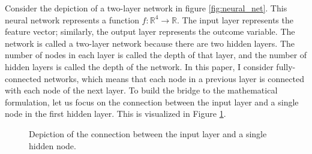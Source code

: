 Consider the depiction of a two-layer network in figure \ref{fig:neural_net}. This
neural network represents a function $f : \mathbb{R}^4 \to \mathbb{R}$. The input layer
represents the feature vector; similarly, the output layer represents the outcome
variable. The network is called a two-layer network because there are two hidden layers. The
number of nodes in each layer is called the depth of that layer, and the number of
hidden layers is called the depth of the network. In this paper, I consider
fully-connected networks, which means that each node in a previous layer is connected
with each node of the next layer. To build the bridge to the mathematical formulation,
let us focus on the connection between the input layer and a single node in the first
hidden layer. This is visualized in Figure \ref{fig:neural_net_single_connection}.

\begin{figure}[!ht]
\centering
{}

\caption{Depiction of the connection between the input layer and a single hidden node.}
\label{fig:neural_net_single_connection}
\end{figure}

